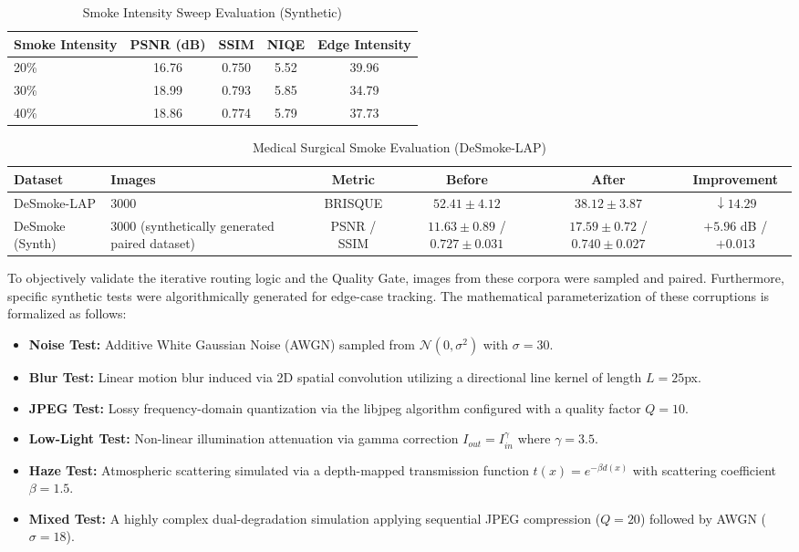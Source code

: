 \documentclass[journal, 10pt]{IEEEtran}
\begin{document}
\begin{table}[t]
\caption{Smoke Intensity Sweep Evaluation (Synthetic)}
\label{tab:smoke_sweep}
\centering
\begin{tabular}{lcccc}
\toprule
\textbf{Smoke Intensity} & \textbf{PSNR (dB)} & \textbf{SSIM} & \textbf{NIQE} & \textbf{Edge Intensity} \\
\midrule
20\% & 16.76 & 0.750 & 5.52 & 39.96 \\
30\% & 18.99 & 0.793 & 5.85 & 34.79 \\
40\% & 18.86 & 0.774 & 5.79 & 37.73 \\
\bottomrule
\end{tabular}
\end{table}

\begin{table}[t]
\caption{Medical Surgical Smoke Evaluation (DeSmoke-LAP)}
\label{tab:medical_benchmarks}
\centering
\begin{tabular}{llcccc}
\toprule
\textbf{Dataset} & \textbf{Images} & \textbf{Metric} & \textbf{Before} & \textbf{After} & \textbf{Improvement} \\
\midrule
DeSmoke-LAP & 3000 & BRISQUE & $52.41 \pm 4.12$ & $38.12 \pm 3.87$ & $\downarrow 14.29$ \\
DeSmoke (Synth) & 3000 (synthetically generated paired dataset) & PSNR / SSIM & $11.63 \pm 0.89$ / $0.727 \pm 0.031$ & $17.59 \pm 0.72$ / $0.740 \pm 0.027$ & $+5.96$ dB / $+0.013$ \\
\bottomrule
\end{tabular}
\end{table}

To objectively validate the iterative routing logic and the Quality Gate, images from these corpora were sampled and paired. Furthermore, specific synthetic tests were algorithmically generated for edge-case tracking. The mathematical parameterization of these corruptions is formalized as follows:
\begin{itemize}
    \item \textbf{Noise Test:} Additive White Gaussian Noise (AWGN) sampled from $\mathcal{N}(0, \sigma^2)$ with $\sigma = 30$.
    \item \textbf{Blur Test:} Linear motion blur induced via 2D spatial convolution utilizing a directional line kernel of length $L=25$px.
    \item \textbf{JPEG Test:} Lossy frequency-domain quantization via the libjpeg algorithm configured with a quality factor $Q=10$.
    \item \textbf{Low-Light Test:} Non-linear illumination attenuation via gamma correction $I_{out} = I_{in}^{\gamma}$ where $\gamma=3.5$.
    \item \textbf{Haze Test:} Atmospheric scattering simulated via a depth-mapped transmission function $t(x) = e^{-\beta d(x)}$ with scattering coefficient $\beta=1.5$.
    \item \textbf{Mixed Test:} A highly complex dual-degradation simulation applying sequential JPEG compression ($Q=20$) followed by AWGN ($\sigma=18$).
\end{itemize}
\end{document}
